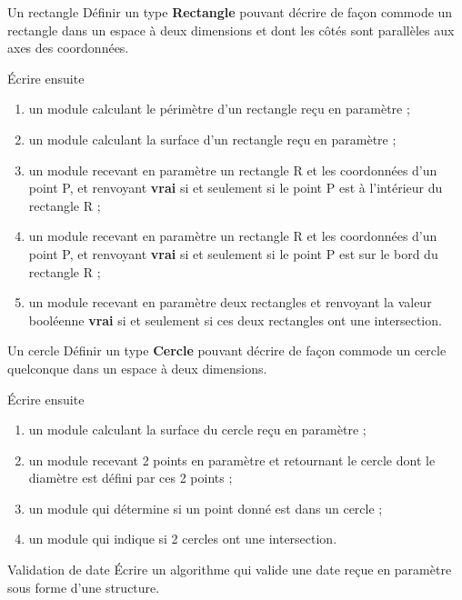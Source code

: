 \begin{Exercice}{Un rectangle}
	Définir un type \textbf{Rectangle} pouvant décrire de façon
	commode un rectangle dans un espace à deux dimensions et dont les côtés
	sont parallèles aux axes des coordonnées. 
	
	Écrire ensuite

	\begin{enumerate}[label=\alph*)]
	\item {
		un module calculant le périmètre d’un rectangle reçu en paramètre ;}
	\item {
		un module calculant la surface d’un rectangle reçu en paramètre ;}
	\item {
		un module recevant en paramètre un rectangle R et les coordonnées
		d'un point P, et renvoyant 
		\textbf{vrai} si et seulement si le point P est à
		l'intérieur du rectangle R ;}
	\item {
		un module recevant en paramètre un rectangle R et les coordonnées
		d'un point P, et renvoyant 
		\textbf{vrai} si et seulement si le point P est sur le bord du
		rectangle R ;}
	\item {
		un module recevant en paramètre deux rectangles et renvoyant la valeur
		booléenne \textbf{vrai} si et seulement si ces deux rectangles ont une
		intersection.}
	\end{enumerate}
\end{Exercice}

\begin{Exercice}{Un cercle}
	Définir un type \textbf{Cercle} pouvant décrire de façon
	commode un cercle quelconque dans un espace à deux dimensions. 
	
	Écrire ensuite
	
	\begin{enumerate}[label=\alph*)]
	\item {
		un module calculant la surface du cercle reçu en paramètre ;}
	\item {
		un module recevant 2 points en paramètre et retournant le cercle dont le
		diamètre est défini par ces 2 points ;}
	\item {
		un module qui détermine si un point donné est dans un cercle ;}
	\item {
		un module qui indique si 2 cercles ont une intersection.
	}
	\end{enumerate}
\end{Exercice}

\begin{Exercice}{Validation de date}
	Écrire un algorithme qui valide une date reçue en paramètre 
	sous forme d'une structure.
\end{Exercice}

	
